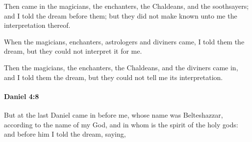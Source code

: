 			\begin{versebox}
					\item[BHS] 
					\item[LXX] 
					\item[ASV] Then came in the magicians, the enchanters, the Chaldeans, and the soothsayers; and I told the dream before them; but they did not make known unto me the interpretation thereof.
					\item[NIV] When the magicians, enchanters, astrologers and diviners came, I told them the dream, but they could not interpret it for me.
					\item[NRSV] Then the magicians, the enchanters, the Chaldeans, and the diviners came in, and I told them the dream, but they could not tell me its interpretation.
			\end{versebox}

		\paragraph{Daniel 4:8} %
			\label{DANIEL-4-8}

			But at the last Daniel came in before me, whose name was Belteshazzar, according to the name of my God, and in whom is the spirit of the holy gods: and before him I told the dream, saying,


